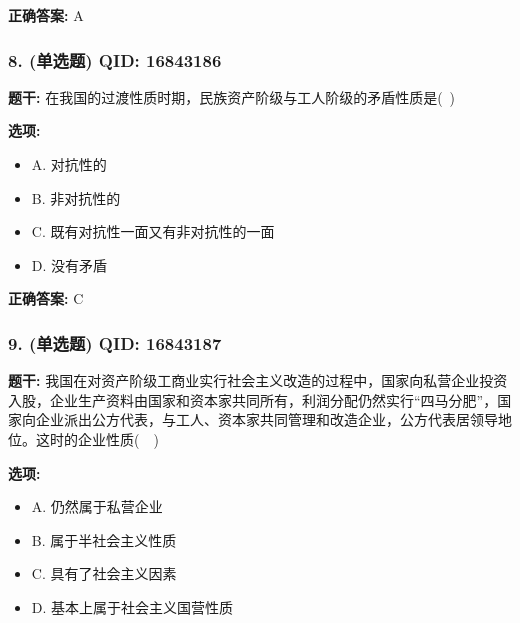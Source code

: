 \documentclass[12pt,UTF8]{ctexart}
\begin{document}
\textbf{正确答案:}
A

\vspace{0.3em}\hrulefill\vspace{0.7em}

\subsubsection*{8. (单选题) \small QID: 16843186}

\textbf{题干:}
在我国的过渡性质时期，民族资产阶级与工人阶级的矛盾性质是( )

\textbf{选项:}
\begin{itemize}[leftmargin=*]

  \item A. 对抗性的

  \item B. 非对抗性的

  \item C. 既有对抗性一面又有非对抗性的一面

  \item D. 没有矛盾

\end{itemize}

\textbf{正确答案:}
C

\vspace{0.3em}\hrulefill\vspace{0.7em}

\subsubsection*{9. (单选题) \small QID: 16843187}

\textbf{题干:}
我国在对资产阶级工商业实行社会主义改造的过程中，国家向私营企业投资入股，企业生产资料由国家和资本家共同所有，利润分配仍然实行“四马分肥”，国家向企业派出公方代表，与工人、资本家共同管理和改造企业，公方代表居领导地位。这时的企业性质(  )

\textbf{选项:}
\begin{itemize}[leftmargin=*]

  \item A. 仍然属于私营企业

  \item B. 属于半社会主义性质

  \item C. 具有了社会主义因素

  \item D. 基本上属于社会主义国营性质

\end{itemize}
\end{document}
